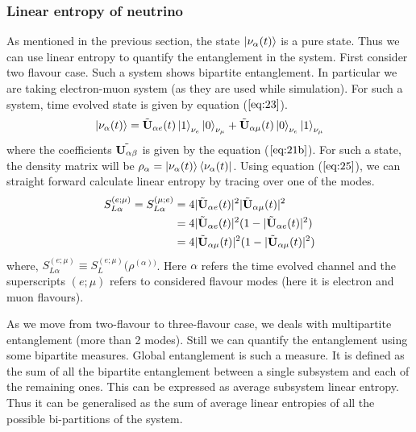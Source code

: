 \documentclass[12pt,a4paper]{report}
\begin{document}
\subsubsection{Linear entropy of neutrino}\label{len}
As mentioned in the previous section, the state $\ket{\nu_{\alpha}(t)}$ is a pure state. Thus we can use linear entropy to quantify the entanglement in the system. First consider two flavour case. Such a system shows bipartite entanglement. In particular we are taking electron-muon system (as they are used while simulation). For such a system, time evolved state is given by equation ($\ref{eq:23}$).
\begin{gather}
\ket{\nu_{\alpha}(t)}=\Tilde{\textbf{U}}_{\alpha e}(t) \ket{1}_{\nu_{e}}\ket{0}_{\nu_{\mu}}+\Tilde{\textbf{U}}_{\alpha \mu}(t) \ket{0}_{\nu_{e}}\ket{1}_{\nu_{\mu}}    
\end{gather}
where the coefficients $\Tilde{\textbf{U}_{\alpha \beta}}$ is given by the equation ($\ref{eq:21b}$). 
For such a state, the density matrix will be $\rho_{\alpha}=\ket{\nu_{\alpha} (t)}\bra{\nu_{\alpha} (t)}$. Using equation ($\ref{eq:25}$), we can straight forward calculate linear entropy by tracing over one of the modes.
\begin{equation}
  \begin{split}
S_{L\alpha}^{(e;\mu)} = S_{L\alpha}^{(\mu;e)}&=4|\Tilde{\textbf{U}}_{\alpha e}(t)|^{2}|\Tilde{\textbf{U}}_{\alpha \mu}(t)|^{2} \\
&=4|\Tilde{\textbf{U}}_{\alpha e}(t)|^{2}(1-|\Tilde{\textbf{U}}_{\alpha e}(t)|^{2})\\
&=4|\Tilde{\textbf{U}}_{\alpha \mu}(t)|^{2}(1-|\Tilde{\textbf{U}}_{\alpha \mu}(t)|^{2})\\
  \end{split}  
\end{equation}
where, $S_{L\alpha}^{(e;\mu)} \equiv S_{L}^(e;\mu)(\rho^{(\alpha))}$. Here $\alpha$ refers the time evolved channel and the superscripts $(e;\mu)$ refers to considered flavour modes (here it is electron and muon flavours).\par
As we move from two-flavour to three-flavour case, we deals with multipartite entanglement (more than 2 modes). Still we can quantify the entanglement using some bipartite measures. Global entanglement is such a measure. It is defined as the sum of all the bipartite entanglement between a single subsystem and each of the remaining ones. This can be expressed as average subsystem linear entropy. Thus it can be generalised as the sum of average linear entropies of all the possible bi-partitions of the system\cite{amico}\cite{brennen}.\par
\end{document}

